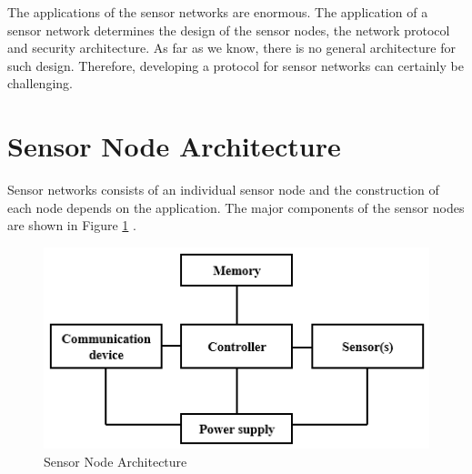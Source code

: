 	The applications of the sensor networks are enormous. 
	The application of a sensor network determines the design of the sensor nodes, the network protocol and security architecture.
	As far as we know, there is no general architecture for such design.
	Therefore, developing a protocol for sensor networks can certainly be challenging. 

\section{Sensor Node Architecture}
	Sensor networks consists of an individual sensor node and the construction of each node depends on the application.
	The major components of the sensor nodes are shown in Figure \ref{fig:sensor-node-architecture} \cite{karl2007protocols}.
	\begin{figure}[h!]
		\centering
		\includegraphics[scale = 1]{images/sensor-node-architecture.png}
		\caption{Sensor Node Architecture}
		\label{fig:sensor-node-architecture}
	\end{figure}

